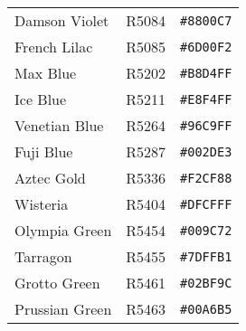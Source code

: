 \documentclass[a4paper]{article}
\begin{document}
\begin{longtable}{|l|l|r|}
Damson Violet & R5084 & \texttt{\#8800C7} \cellcolor[HTML]{8800C7} \\
French Lilac & R5085 & \texttt{\#6D00F2} \cellcolor[HTML]{6D00F2} \\
Max Blue & R5202 & \texttt{\#B8D4FF} \cellcolor[HTML]{B8D4FF} \\
Ice Blue & R5211 & \texttt{\#E8F4FF} \cellcolor[HTML]{E8F4FF} \\
Venetian Blue & R5264 & \texttt{\#96C9FF} \cellcolor[HTML]{96C9FF} \\
Fuji Blue & R5287 & \texttt{\#002DE3} \cellcolor[HTML]{002DE3} \\
Aztec Gold & R5336 & \texttt{\#F2CF88} \cellcolor[HTML]{F2CF88} \\
Wisteria & R5404 & \texttt{\#DFCFFF} \cellcolor[HTML]{DFCFFF} \\
Olympia Green & R5454 & \texttt{\#009C72} \cellcolor[HTML]{009C72} \\
Tarragon & R5455 & \texttt{\#7DFFB1} \cellcolor[HTML]{7DFFB1} \\
Grotto Green & R5461 & \texttt{\#02BF9C} \cellcolor[HTML]{02BF9C} \\
Prussian Green & R5463 & \texttt{\#00A6B5} \cellcolor[HTML]{00A6B5} \\
\hline
\end{longtable}
\end{document}
